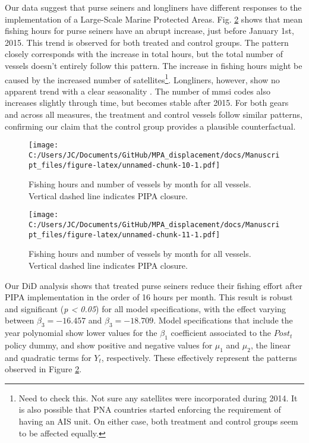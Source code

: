 \documentclass[11pt,]{article}
\let\rmarkdownfootnote\footnote%
\def\footnote{\protect\rmarkdownfootnote}
\begin{document}
Our data suggest that purse seiners and longliners have different
responses to the implementation of a Large-Scale Marine Protected Areas.
Fig. \ref{fig:all_vessels} shows that mean fishing hours for purse
seiners have an abrupt increase, just before January 1st, 2015. This
trend is observed for both treated and control groups. The pattern
closely corresponds with the increase in total hours, but the total
number of vessels doesn't entirely follow this pattern. The increase in
fishing hours might be caused by the increased number of
satellites\footnote{Need to check this. Not sure any satellites were
  incorporated during 2014. It is also possible that PNA countries
  started enforcing the requirement of having an AIS unit. On either
  case, both treatment and control groups seem to be affected equally.}.
Longliners, however, show no apparent trend with a clear seasonality
\citep{ortuocrespo_2018}. The number of mmsi codes also increases
slightly through time, but becomes stable after 2015. For both gears and
across all measures, the treatment and control vessels follow similar
patterns, confirming our claim that the control group provides a
plausible counterfactual.

\begin{figure}
\centering
\texttt{[image: C:/Users/JC/Documents/GitHub/MPA\_displacement/docs/Manuscript\_files/figure-latex/unnamed-chunk-10-1.pdf]}
\caption{\label{fig:unnamed-chunk-10}\label{fig:all_vessels}Fishing hours
and number of vessels by month for all vessels. Vertical dashed line
indicates PIPA closure.}
\end{figure}

\begin{figure}
\centering
\texttt{[image: C:/Users/JC/Documents/GitHub/MPA\_displacement/docs/Manuscript\_files/figure-latex/unnamed-chunk-11-1.pdf]}
\caption{\label{fig:unnamed-chunk-11}\label{fig:all_vessels}Fishing hours
and number of vessels by month for all vessels. Vertical dashed line
indicates PIPA closure.}
\end{figure}

Our DiD analysis shows that treated purse seiners reduce their fishing
effort after PIPA implementation in the order of 16 hours per month.
This result is robust and significant (\emph{p \textless{} 0.05}) for
all model specifications, with the effect varying between
\(\beta_3 = -16.457\) and \(\beta_3 = -18.709\). Model specifications
that include the year polynomial show lower values for the \(\beta_1\)
coefficient associated to the \(Post_t\) policy dummy, and show positive
and negative values for \(\mu_1\) and \(\mu_2\), the linear and
quadratic terms for \(Y_t\), respectively. These effectively represent
the patterns observed in Figure \ref{fig:all_vessels}.
\end{document}
